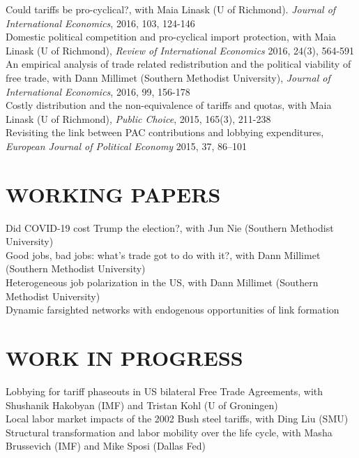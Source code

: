 \documentclass[11pt]{res}
\begin{document}
\begin{resume}
{Could tariffs be pro-cyclical?}, with Maia Linask (U of Richmond). \emph{Journal of International Economics}, 2016, 103, 124-146 \vspace{1.5mm}\\
{Domestic political competition and pro-cyclical import protection}, with Maia Linask (U of Richmond), \emph{Review of International Economics} 2016, 24(3), 564-591\vspace{1.5mm}\\
{An empirical analysis of trade related redistribution and the political viability of free trade}, with Dann Millimet (Southern Methodist University), \emph{Journal of International Economics}, 2016, 99, 156-178 \vspace{1.5mm}\\
{Costly distribution and the non-equivalence of tariffs and quotas}, with Maia Linask (U of Richmond), \emph{Public Choice}, 2015, 165(3), 211-238 \vspace{1.5mm}\\
{Revisiting the link between PAC contributions and lobbying expenditures, \emph{European Journal of Political Economy}} 2015, 37, 86--101

\section{WORKING PAPERS}\vspace{1.5mm}
{Did COVID-19 cost Trump the election?}, with Jun Nie (Southern Methodist University)\vspace{1.5mm}\\
{Good jobs, bad jobs: what's trade got to do with it?}, with Dann Millimet (Southern Methodist University)\vspace{1.5mm}\\
{Heterogeneous job polarization in the US}, with Dann Millimet (Southern Methodist University)\vspace{1.5mm}\\
{Dynamic farsighted networks with endogenous opportunities of link formation}

\section{WORK IN PROGRESS}\vspace{1.5mm}
Lobbying for tariff phaseouts in US bilateral Free Trade Agreements, with Shushanik Hakobyan (IMF) and Tristan Kohl (U of Groningen)\vspace{1.5mm}\\
Local labor market impacts of the 2002 Bush steel tariffs, with Ding Liu (SMU)\vspace{1.5mm}\\
Structural transformation and labor mobility over the life cycle, with Masha Brussevich (IMF) and Mike Sposi (Dallas Fed)



\end{resume}
\end{document}
